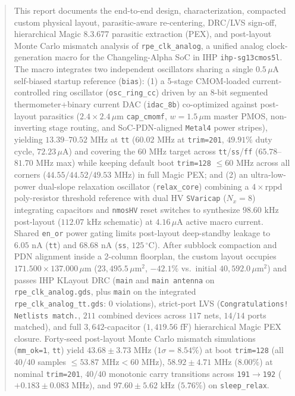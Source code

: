 \documentclass[10pt,a4paper]{article}
\begin{document}
\begin{abstract}
\noindent This report documents the end-to-end design, characterization, compacted custom physical layout, parasitic-aware re-centering, DRC/LVS sign-off, hierarchical Magic 8.3.677 parasitic extraction (PEX), and post-layout Monte Carlo mismatch analysis of \texttt{rpe\_clk\_analog}, a unified analog clock-generation macro for the Changeling-Alpha SoC in IHP \texttt{ihp-sg13cmos5l}. The macro integrates two independent oscillators sharing a single $0.5\,\mu\text{A}$ self-biased startup reference (\texttt{bias}): (1) a 5-stage CMOM-loaded current-controlled ring oscillator (\texttt{osc\_ring\_cc}) driven by an 8-bit segmented thermometer+binary current DAC (\texttt{idac\_8b}) co-optimized against post-layout parasitics ($2.4\times 2.4\,\mu\text{m}$ \texttt{cap\_cmomf}, $w=1.5\,\mu\text{m}$ master PMOS, non-inverting stage routing, and SoC-PDN-aligned \texttt{Metal4} power stripes), yielding $13.39$--$70.52\text{ MHz}$ at \texttt{tt} ($60.02\text{ MHz}$ at \texttt{trim=201}, $49.91\%$ duty cycle, $72.23\,\mu\text{A}$) and covering the $60\text{ MHz}$ target across \texttt{tt}/\texttt{ss}/\texttt{ff} ($65.78$--$81.70\text{ MHz}$ max) while keeping default boot \texttt{trim=128} $\le 60\text{ MHz}$ across all corners ($44.55 / 44.52 / 49.53\text{ MHz}$) in full Magic PEX; and (2) an ultra-low-power dual-slope relaxation oscillator (\texttt{relax\_core}) combining a $4\times\text{rppd}$ poly-resistor threshold reference with dual HV \texttt{SVaricap} ($N_x=8$) integrating capacitors and \texttt{nmosHV} reset switches to synthesize $98.60\text{ kHz}$ post-layout ($112.07\text{ kHz}$ schematic) at $4.16\,\mu\text{A}$ active macro current. Shared \texttt{en\_or} power gating limits post-layout deep-standby leakage to $6.05\text{ nA}$ (\texttt{tt}) and $68.68\text{ nA}$ (\texttt{ss}, $125\,^\circ\text{C}$). After subblock compaction and PDN alignment inside a 2-column floorplan, the custom layout occupies $171.500 \times 137.000\,\mu\text{m}$ ($23{,}495.5\,\mu\text{m}^2$, $-42.1\%$ vs.\ initial $40{,}592.0\,\mu\text{m}^2$) and passes IHP KLayout DRC (\texttt{main} and \texttt{main antenna} on \texttt{rpe\_clk\_analog.gds}, plus \texttt{main} on the integrated \texttt{rpe\_clk\_analog\_tt.gds}: $0$ violations), strict-port LVS (\texttt{Congratulations! Netlists match.}, $211$ combined devices across $117$ nets, $14/14$ ports matched), and full $3{,}642$-capacitor ($1{,}419.56\text{ fF}$) hierarchical Magic PEX closure. Forty-seed post-layout Monte Carlo mismatch simulations (\texttt{mm\_ok=1}, \texttt{tt}) yield $43.68 \pm 3.73\text{ MHz}$ ($1\sigma = 8.54\%$) at boot \texttt{trim=128} (all $40/40$ samples $\le 53.87\text{ MHz} < 60\text{ MHz}$), $58.92 \pm 4.71\text{ MHz}$ ($8.00\%$) at nominal \texttt{trim=201}, $40/40$ monotonic carry transitions across \texttt{191}$\to$\texttt{192} ($+0.183 \pm 0.083\text{ MHz}$), and $97.60 \pm 5.62\text{ kHz}$ ($5.76\%$) on \texttt{sleep\_relax}.
\end{abstract}
\end{document}
